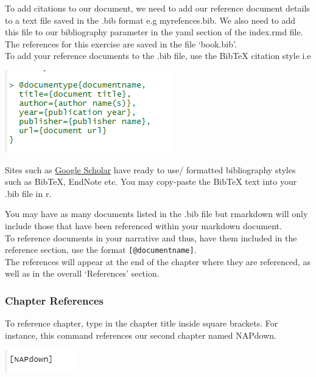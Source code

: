 \documentclass[
]{book}
\let\origfigure\figure
\let\endorigfigure\endfigure
\renewenvironment{figure}[1][2] {
    \expandafter\origfigure\expandafter[H]
} {
    \endorigfigure
}
\begin{document}
To add citations to our document, we need to add our reference document details to a text file saved in the .bib format e.g myrefences.bib. We also need to add this file to our bibliography parameter in the yaml section of the index.rmd file.\\
The references for this exercise are saved in the file `book.bib'.\\
To add your reference documents to the .bib file, use the BibTeX citation style i.e

\begin{figure}
\centering
\includegraphics{tutorial_screenshots/citations.png}
\caption{citations}
\end{figure}

Sites such as \href{https://scholar.google.com/}{Google Scholar} have ready to use/ formatted bibliography styles such as BibTeX, EndNote etc. You may copy-paste the BibTeX text into your .bib file in r.

You may have as many documents listed in the .bib file but rmarkdown will only include those that have been referenced within your markdown document.\\
To reference documents in your narrative and thus, have them included in the reference section, use the format \texttt{{[}@documentname{]}}.\\
The references will appear at the end of the chapter where they are referenced, as well as in the overall `References' section.

\hypertarget{chapter-references}{%
\subsubsection{Chapter References}\label{chapter-references}}

To reference chapter, type in the chapter title inside square brackets. For instance, this command references our second chapter named NAPdown.

\begin{figure}
\centering
\includegraphics{tutorial_screenshots/ref_chapters_sections.png}
\caption{chapter ref}
\end{figure}
\end{document}
